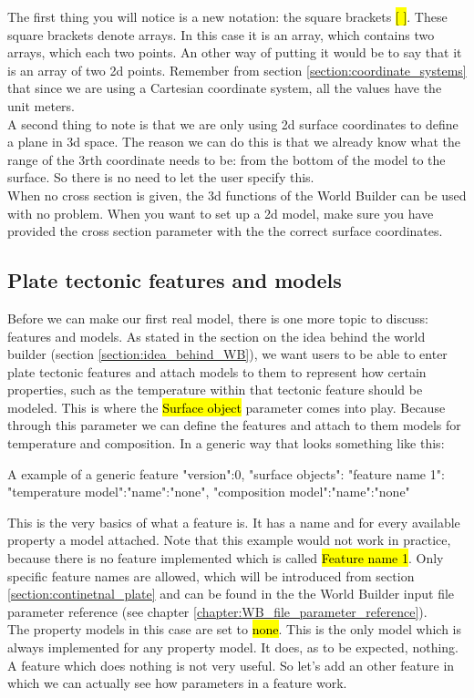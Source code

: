 \documentclass{book}
\newcommand{\WB}{{World Builder}}
\begin{document}
The first thing you will notice is a new notation: the square brackets \hl{[ ]}. These square brackets denote arrays. In this case it is an array, which contains two arrays, which each two points. An other way of putting it would be to say that it is an array of two 2d points. Remember from section \ref{section:coordinate_systems} that since we are using a Cartesian coordinate system, all the values have the unit meters. 
\\
A second thing to note is that we are only using 2d surface coordinates to define a plane in 3d space. The reason we can do this is that we already know what the range of the 3rth coordinate needs to be: from the bottom of the model to the surface. So there is no need to let the user specify this.
\\
When no cross section is given, the 3d functions of the \WB{} can be used with no problem. When you want to set up a 2d model, make sure you have provided the cross section parameter with the the correct surface coordinates.

\subsection{Plate tectonic features and models}
Before we can make our first real model, there is one more topic to discuss: features and models. As stated in the section on the idea behind the world builder (section \ref{section:idea_behind_WB}), we want users to be able to enter plate tectonic features and attach models to them to represent how certain properties, such as the temperature within that tectonic feature should be modeled. This is where the \hl{Surface object} parameter comes into play. Because through this parameter we can define the features and attach to them models for temperature and composition. In a generic way that looks something like this:

\begin{bashcode}{A example of a generic feature}
"version":0,
"surface objects":
{
  "feature name 1":
  {
    "temperature model":{"name":"none"},
    "composition model":{"name":"none"}
  }
}
\end{bashcode}

This is the very basics of what a feature is. It has a name and for every available property a model attached. Note that this example would not work in practice, because there is no feature implemented which is called \hl{Feature name 1}. Only specific feature names are allowed, which will be introduced from section \ref{section:continetnal_plate} and can be found in the the \WB{} input file parameter reference (see chapter \ref{chapter:WB_file_parameter_reference}).
\\
The property models in this case are set to \hl{none}. This is the only model which is always implemented for any property model. It does, as to be expected, nothing.
\\
A feature which does nothing is not very useful. So let's add an other feature in which we can actually see how parameters in a feature work.
\end{document}
